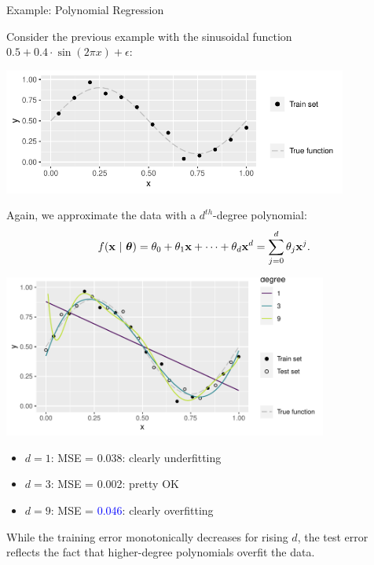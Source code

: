 \begin{vbframe}{Example: Polynomial Regression}

Consider the previous example with the sinusoidal function
$0.5 + 0.4 \cdot \sin (2 \pi x) + \epsilon$:

\vfill

\begin{center}
  \includegraphics[width=0.85\textwidth]{figure/eval_train_1}
\end{center}

Again, we approximate the data with a $d^{th}$-degree polynomial:
\[ f(\mathbf{x} ~|~ \bm{\theta}) = \theta_0 + \theta_1 \mathbf{x} + \cdots + \theta_d \mathbf{x}^d = \sum_{j = 0}^{d}
\theta_j \mathbf{x}^j\text. \]

\framebreak

\includegraphics[width=0.8\textwidth]{figure/eval_test_2} 

\begin{itemize}
  \footnotesize
  \item $d = 1$: MSE = 0.038: clearly underfitting
  \item $d = 3$: MSE = 0.002: pretty OK
  \item $d = 9$: MSE = \textcolor{blue}{0.046}: clearly overfitting
\end{itemize}

\vfill

While the training error monotonically decreases for rising $d$, 
the test error reflects the fact that higher-degree polynomials overfit 
the data.

\end{vbframe}


